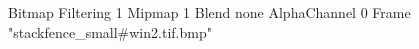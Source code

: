 {Bitmap
	{Filtering 1}
	{Mipmap 1}
	{Blend none}
	{AlphaChannel 0}
	{Frame "stackfence_small#win2.tif.bmp"}
}
